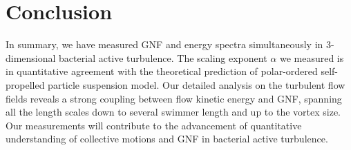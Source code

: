 \section{Conclusion}
In summary, we have measured GNF and energy spectra simultaneously in 3-dimensional bacterial active turbulence. The scaling exponent $\alpha$ we measured is in quantitative agreement with the theoretical prediction of polar-ordered self-propelled particle suspension model.
Our detailed analysis on the turbulent flow fields reveals a strong coupling between flow kinetic energy and GNF, spanning all the length scales down to several swimmer length and up to the vortex size.
Our measurements will contribute to the advancement of quantitative understanding of collective motions and GNF in bacterial active turbulence.
